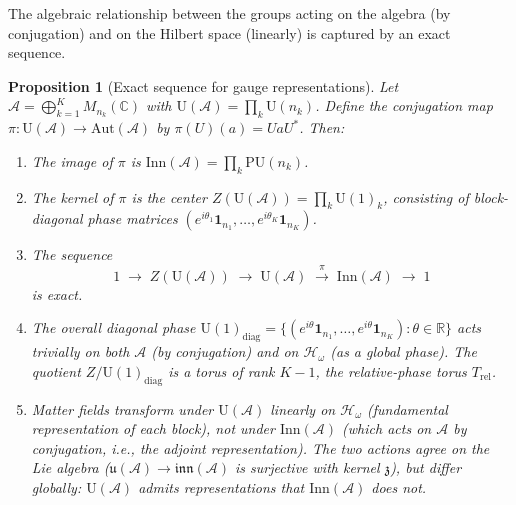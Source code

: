 \documentclass[11pt,a4paper]{article}
\newtheorem{proposition}[theorem]{Proposition}
\theoremstyle{definition}
\begin{document}
The algebraic relationship between the groups acting on the algebra
(by conjugation) and on the Hilbert space (linearly) is captured by
an exact sequence.

\begin{proposition}[Exact sequence for gauge representations]%
\label{prop:exact_seq}
Let $\mathcal{A} = \bigoplus_{k=1}^K M_{n_k}(\mathbb{C})$ with
$\mathrm{U}(\mathcal{A}) = \prod_k \mathrm{U}(n_k)$.  Define
the conjugation map $\pi: \mathrm{U}(\mathcal{A}) \to
\mathrm{Aut}(\mathcal{A})$ by $\pi(U)(a) = UaU^*$.  Then:
\begin{enumerate}[label=(\roman*),nosep]
  \item The image of $\pi$ is $\mathrm{Inn}(\mathcal{A}) = \prod_k
  \mathrm{PU}(n_k)$.
  \item The kernel of $\pi$ is the center
  $Z(\mathrm{U}(\mathcal{A})) = \prod_k \mathrm{U}(1)_k$,
  consisting of block-diagonal phase matrices
  $(e^{i\theta_1}\mathbf{1}_{n_1}, \ldots,
  e^{i\theta_K}\mathbf{1}_{n_K})$.
  \item The sequence
  \[
    1 \;\longrightarrow\; Z(\mathrm{U}(\mathcal{A}))
    \;\longrightarrow\; \mathrm{U}(\mathcal{A})
    \;\xrightarrow{\;\pi\;}\;
    \mathrm{Inn}(\mathcal{A}) \;\longrightarrow\; 1
  \]
  is exact.
  \item The overall diagonal phase
  $\mathrm{U}(1)_{\mathrm{diag}} = \{(e^{i\theta}\mathbf{1}_{n_1},
  \ldots, e^{i\theta}\mathbf{1}_{n_K}) : \theta \in \mathbb{R}\}$
  acts trivially on both $\mathcal{A}$ (by conjugation) and on
  $\mathcal{H}_\omega$ (as a global phase).  The quotient
  $Z / \mathrm{U}(1)_{\mathrm{diag}}$ is a torus of rank $K - 1$, the
  relative-phase torus $T_{\mathrm{rel}}$.
  \item Matter fields transform under $\mathrm{U}(\mathcal{A})$
  linearly on $\mathcal{H}_\omega$ (fundamental representation of each
  block), not under $\mathrm{Inn}(\mathcal{A})$ (which acts on
  $\mathcal{A}$ by conjugation, i.e., the adjoint representation).
  The two actions agree on the Lie algebra
  ($\mathfrak{u}(\mathcal{A}) \to
  \mathfrak{inn}(\mathcal{A})$ is surjective with kernel
  $\mathfrak{z}$), but differ globally: $\mathrm{U}(\mathcal{A})$
  admits representations that $\mathrm{Inn}(\mathcal{A})$ does not.
\end{enumerate}
\end{proposition}
\end{document}
